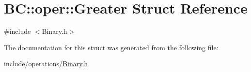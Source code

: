 \hypertarget{structBC_1_1oper_1_1Greater}{}\section{BC\+:\+:oper\+:\+:Greater Struct Reference}
\label{structBC_1_1oper_1_1Greater}


{\ttfamily \#include $<$Binary.\+h$>$}



The documentation for this struct was generated from the following file\+:\begin{DoxyCompactItemize}
\item 
include/operations/\hyperlink{Binary_8h}{Binary.\+h}\end{DoxyCompactItemize}
